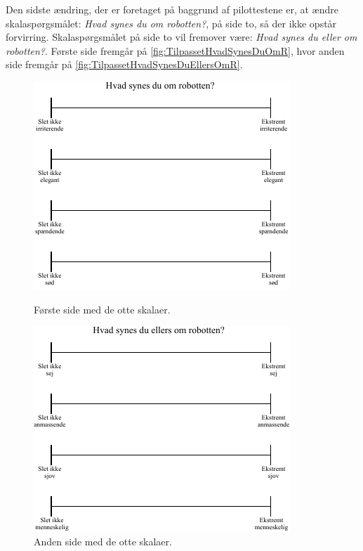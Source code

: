 \noindent
%
Den sidste ændring, der er foretaget på baggrund af pilottestene er, at ændre skalaspørgsmålet: \textit{Hvad synes du om robotten?}, på side to, så der ikke opstår forvirring. Skalaspørgsmålet på side to vil fremover være: \textit{Hvad synes du eller om robotten?}. Første side fremgår på \autoref{fig:TilpassetHvadSynesDuOmR}, hvor anden side fremgår på \autoref{fig:TilpassetHvadSynesDuEllersOmR}.  
%
\begin{figure}[H]
\centering
\begin{minipage}{.5\textwidth}
  \centering
  \includegraphics[width=\linewidth]{Figure/TestdesignEvaluering/TilpassetHvadSynesDuOmR}
  \caption{Første side med de otte skalaer.}
  \label{fig:TilpassetHvadSynesDuOmR}
\end{minipage}%
\begin{minipage}{.5\textwidth}
  \centering
  \includegraphics[width=\linewidth]{Figure/TestdesignEvaluering/HvadSynesDuEllersOmR}
  \caption{Anden side med de otte skalaer.}
  \label{fig:TilpassetHvadSynesDuEllersOmR}
\end{minipage}
\end{figure}
\noindent
%
